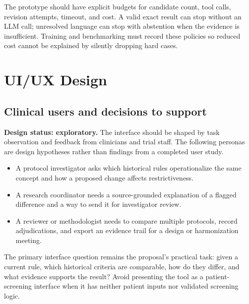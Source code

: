 \documentclass[10pt,letterpaper]{article}
\begin{document}
The prototype should have explicit budgets for candidate count, tool calls,
revision attempts, timeout, and cost. A valid exact result can stop without
an LLM call; unresolved language can stop with abstention when the evidence
is insufficient. Training and benchmarking must record these policies so
reduced cost cannot be explained by silently dropping hard cases.

\section{UI/UX Design}
\label{sec:ui}

\subsection{Clinical users and decisions to support}
\textbf{Design status: exploratory.} The interface should be shaped by task
observation and feedback from clinicians and trial staff. The following
personas are design hypotheses rather than findings from a completed user
study.
\begin{itemize}
\item A protocol investigator asks which historical rules operationalize the
same concept and how a proposed change affects restrictiveness.
\item A research coordinator needs a source-grounded explanation of a flagged
difference and a way to send it for investigator review.
\item A reviewer or methodologist needs to compare multiple protocols, record
adjudications, and export an evidence trail for a design or harmonization meeting.
\end{itemize}

The primary interface question remains the proposal's practical task: given a
current rule, which historical criteria are comparable, how do they differ,
and what evidence supports the result? Avoid presenting the tool as a
patient-screening interface when it has neither patient inputs nor validated
screening logic.
\end{document}
